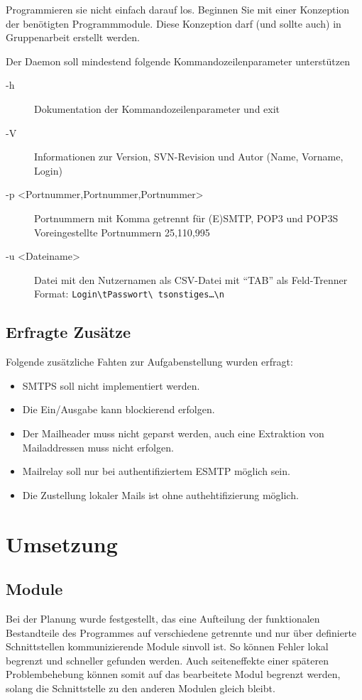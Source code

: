 \documentclass[final,a4paper,11pt,notitlepage,halfparskip]{scrreprt}
\begin{document}
Programmieren sie nicht einfach darauf los. Beginnen Sie mit einer Konzeption 
der benötigten Programmmodule. Diese Konzeption darf (und sollte auch) in 
Gruppenarbeit erstellt werden.

Der Daemon soll mindestend folgende Kommandozeilenparameter unterstützen
\begin{description}
  \item[-h] Dokumentation der Kommandozeilenparameter und exit
  \item[-V] Informationen zur Version, SVN-Revision und Autor (Name, Vorname, Login)
  \item[-p <Portnummer,Portnummer,Portnummer>] Portnummern mit Komma getrennt
            für (E)SMTP, POP3 und POP3S\\ 
            Voreingestellte Portnummern 25,110,995
  \item[-u <Dateiname>] Datei mit den Nutzernamen als CSV-Datei mit "`TAB"' als 
            Feld-Trenner\\ 
	    Format: \texttt{Login\textbackslash tPasswort\textbackslash
	    tsonstiges\dots\textbackslash n}
\end{description} 

\section{Erfragte Zusätze}
Folgende zusätzliche Fahten zur Aufgabenstellung wurden erfragt:
\begin{itemize}
  \item SMTPS soll nicht implementiert werden.
  \item Die Ein/Ausgabe kann blockierend erfolgen.
  \item Der Mailheader muss nicht geparst werden, auch eine Extraktion von
        Mailaddressen muss nicht erfolgen.
  \item Mailrelay soll nur bei authentifiziertem ESMTP möglich sein.
  \item Die Zustellung lokaler Mails ist ohne authehtifizierung möglich. 
\end{itemize}



\chapter{Umsetzung}
\section{Module}
Bei der Planung wurde festgestellt, das eine Aufteilung der funktionalen
Bestandteile des Programmes auf verschiedene getrennte und nur über definierte
Schnittstellen kommunizierende Module sinvoll ist. So können Fehler lokal
begrenzt und schneller gefunden werden. Auch seiteneffekte einer späteren 
Problembehebung können somit auf das bearbeitete Modul begrenzt werden, solang
die Schnittstelle zu den anderen Modulen gleich bleibt. 
\end{document}
